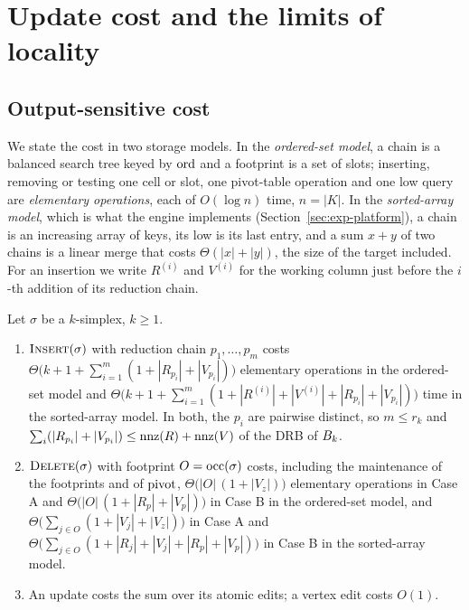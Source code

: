 \section{Update cost and the limits of locality}\label{sec:cost-locality}

\subsection{Output-sensitive cost}\label{sec:cost}

We state the cost in two storage models. In the \emph{ordered-set model}, a
chain is a balanced search tree keyed by $\operatorname{ord}$ and a footprint is a set of
slots; inserting, removing or testing one cell or slot, one pivot-table
operation and one low query are \emph{elementary operations}, each of
$O(\log n)$ time, $n=|K|$. In the \emph{sorted-array model}, which is what the
engine implements (Section~\ref{sec:exp-platform}), a chain is an increasing
array of keys, its low is its last entry, and a sum $x+y$ of two chains is a
linear merge that costs $\Theta(|x|+|y|)$, the size of the target included.
For an insertion we write $R^{(i)}$ and $V^{(i)}$ for the working column just
before the $i$-th addition of its reduction chain.

\begin{proposition}\label{prop:cost}
Let $\sigma$ be a $k$-simplex, $k\ge1$.
\begin{enumerate}
\item[(a)] $\textup{\textsc{Insert}}(\sigma)$ with reduction chain $p_1,\dots,p_m$ costs
  $\Theta\bigl(k+1+\sum_{i=1}^{m}(1+|R_{p_i}|+|V_{p_i}|)\bigr)$ elementary
  operations in the ordered-set model and
  $\Theta\bigl(k+1+\sum_{i=1}^{m}(1+|R^{(i)}|+|V^{(i)}|+|R_{p_i}|+|V_{p_i}|)\bigr)$
  time in the sorted-array model. In both, the $p_i$ are pairwise distinct, so
  $m\le r_k$ and $\sum_i(|R_{p_i}|+|V_{p_i}|)\le\operatorname{nnz}(R)+\operatorname{nnz}(V)$ of the DRB of
  $B_{k}$.
\item[(b)] $\textup{\textsc{Delete}}(\sigma)$ with footprint $O=\operatorname{occ}(\sigma)$ costs, including the
  maintenance of the footprints and of $\operatorname{pivot}$,
  $\Theta\bigl(|O|\,(1+|V_z|)\bigr)$ elementary operations in Case A and
  $\Theta\bigl(|O|\,(1+|R_p|+|V_p|)\bigr)$ in Case B in the ordered-set model,
  and $\Theta\bigl(\sum_{j\in O}(1+|V_j|+|V_z|)\bigr)$ in Case A and
  $\Theta\bigl(\sum_{j\in O}(1+|R_j|+|V_j|+|R_p|+|V_p|)\bigr)$ in Case B in the
  sorted-array model.
\item[(c)] An update costs the sum over its atomic edits; a vertex edit costs
  $O(1)$.
\end{enumerate}
\end{proposition}

